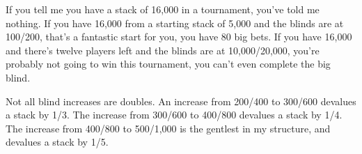 If you tell me you have a stack of 16,000 in a tournament, you've
told me nothing. If you have 16,000 from a starting stack of 5,000
and the blinds are at 100/200, that's a fantastic start for you, you
have 80 big bets. If you have 16,000 and there's twelve
players left and the blinds are at 10,000/20,000, you're probably
not going to win this tournament, you can't even complete the big blind.

Not all blind increases are doubles. An increase from 200/400 to 300/600
devalues a stack by 1/3. The increase from 300/600 to 400/800 devalues
a stack by 1/4. The increase from 400/800 to 500/1,000 is the gentlest
in my structure, and devalues a stack by 1/5.



